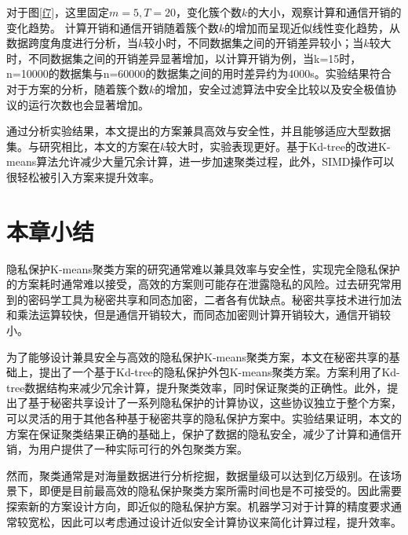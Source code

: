 对于图\ref{f7}，这里固定$ m=5,T=20 $，变化簇个数$ k $的大小，观察计算和通信开销的变化趋势。
计算开销和通信开销随着簇个数$ k $的增加而呈现近似线性变化趋势，从数据跨度角度进行分析，当$ k $较小时，不同数据集之间的开销差异较小；当$ k $较大时，不同数据集之间的开销差异显著增加，以计算开销为例，当k=15时，n=10000的数据集与n=60000的数据集之间的用时差异约为4000s。实验结果符合对于方案的分析，随着簇个数$ k $的增加，安全过滤算法中安全比较以及安全极值协议的运行次数也会显著增加。

通过分析实验结果，本文提出的方案兼具高效与安全性，并且能够适应大型数据集。与研究\cite{wu2020secure,rong2017privacy}相比，本文的方案在$ k $较大时，实验表现更好。基于Kd-tree的改进K-means算法允许减少大量冗余计算，进一步加速聚类过程，此外，SIMD操作可以很轻松被引入方案来提升效率。

\section{本章小结}
\label{s3-xiaojie}
隐私保护K-means聚类方案的研究通常难以兼具效率与安全性，实现完全隐私保护的方案耗时通常难以接受\cite{jaschke2019unsupervised}，高效的方案则可能存在泄露隐私的风险\cite{wu2020secure}。过去研究常用到的密码学工具为秘密共享\cite{mohassel2019practical}和同态加密\cite{jaschke2019unsupervised}\cite{wu2020secure}，二者各有优缺点。秘密共享技术进行加法和乘法运算较快，但是通信开销较大，而同态加密则计算开销较大，通信开销较小。

为了能够设计兼具安全与高效的隐私保护K-means聚类方案，本文在秘密共享的基础上，提出了一个基于Kd-tree的隐私保护外包K-means聚类方案。方案利用了Kd-tree数据结构来减少冗余计算，提升聚类效率，同时保证聚类的正确性。此外，提出了基于秘密共享设计了一系列隐私保护的计算协议，这些协议独立于整个方案，可以灵活的用于其他各种基于秘密共享的隐私保护方案中。实验结果证明，本文的方案在保证聚类结果正确的基础上，保护了数据的隐私安全，减少了计算和通信开销，为用户提供了一种实际可行的外包聚类方案。

然而，聚类通常是对海量数据进行分析挖掘，数据量级可以达到亿万级别。在该场景下，即便是目前最高效的隐私保护聚类方案所需时间也是不可接受的。因此需要探索新的方案设计方向，即近似的隐私保护方案。机器学习对于计算的精度要求通常较宽松，因此可以考虑通过设计近似安全计算协议来简化计算过程，提升效率。